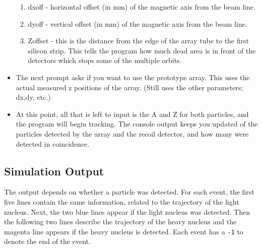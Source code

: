 \begin{singlespace}
\begin{itemize}
\begin{enumerate}
			\item \textsf{dxoff} - horizontal offset (in mm) of the magnetic axis from the beam line.
			\item \textsf{dyoff} - vertical offset (in mm) of the magnetic axis from the beam line.
			\item \textsf{Zoffset} - this is the distance from the edge of the array tube to the first silicon strip. This tells the program how much dead area is in front of the detectors which stops some of the multiple orbits.
		\end{enumerate}
	\item The next prompt asks if you want to use the prototype array. This uses the actual measured z positions of the array. (Still uses the other parameters; dx,dy, etc.)
	\item At this point, all that is left to input is the A and Z for both particles, and the program will begin tracking. The console output keeps you updated of the particles detected by the array and the recoil detector, and how many were detected in coincidence.
\end{itemize}
\end{singlespace}

\subsection{Simulation Output}
The output depends on whether a particle was detected. For each event, the first five lines contain the same information, related to the trajectory of the light nucleus.  Next, the two blue lines appear if the light nucleus was detected.  Then the following two lines describe the trajectory of the heavy nucleus and the magenta line appears if the heavy nucleus is detected. Each event has a \texttt{-1} to denote the end of the event.\\

